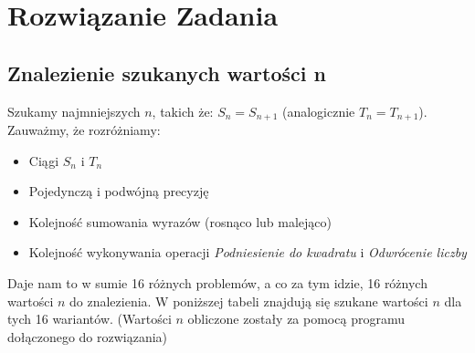 \documentclass[12pt,a4paper]{article}
\begin{document}
\section{Rozwiązanie Zadania}

\subsection{Znalezienie szukanych wartości n}
Szukamy najmniejszych $n$, takich że: $S_n = S_{n+1}$ (analogicznie $T_n = T_{n+1}$). Zauważmy, że rozróżniamy:
\begin{itemize}
	\item Ciągi $S_n$ i $T_n$
  	\item Pojedynczą i podwójną precyzję
  	\item Kolejność sumowania wyrazów (rosnąco lub malejąco)
  	\item Kolejność wykonywania operacji \textit{Podniesienie do kwadratu} i \textit{Odwrócenie liczby}
\end{itemize}
Daje nam to w sumie 16 różnych problemów, a co za tym idzie, 16 różnych wartości $n$ do znalezienia. W poniższej tabeli znajdują się szukane wartości $n$ dla tych 16 wariantów. (Wartości $n$ obliczone zostały za pomocą programu dołączonego do rozwiązania)
\end{document}

